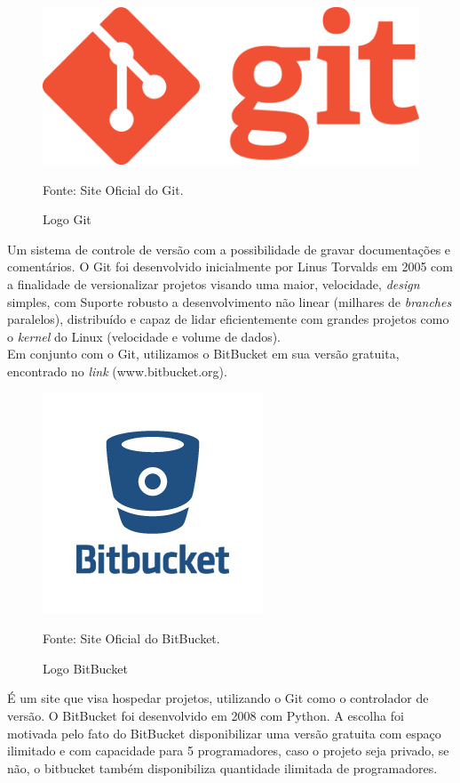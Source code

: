 \begin{figure}[!htb]
	\centering
	\includegraphics[scale=0.10
	]{imagens/logo_git}
	\caption{Logo Git}
	Fonte: Site Oficial do Git.
	\label{Rotulo}
\end{figure}

Um sistema de controle de versão com a possibilidade de gravar documentações e comentários. O Git foi desenvolvido inicialmente por Linus Torvalds em 2005 com a finalidade de versionalizar projetos visando uma maior, velocidade, {\it design} simples, com Suporte robusto a desenvolvimento não linear (milhares de {\it branches} paralelos), distribuído e capaz de lidar eficientemente com grandes projetos como o {\it kernel} do Linux (velocidade e volume de dados).
\\
\indent 
Em conjunto com o Git, utilizamos o BitBucket em sua versão gratuita, encontrado no {\it link} (www.bitbucket.org).

\begin{figure}[!htb]
	\centering
	\includegraphics[scale=0.50
	]{imagens/bitbucket-logo}
	\caption{Logo BitBucket}
	Fonte: Site Oficial do BitBucket.
	\label{Rotulo}
\end{figure}

 É um site que visa hospedar projetos, utilizando o Git como o controlador de versão. O BitBucket foi desenvolvido em 2008 com Python. A escolha foi motivada pelo fato do BitBucket disponibilizar uma versão gratuita com espaço ilimitado e com capacidade para 5 programadores, caso o projeto seja privado, se não, o bitbucket também disponibiliza quantidade ilimitada de programadores.


